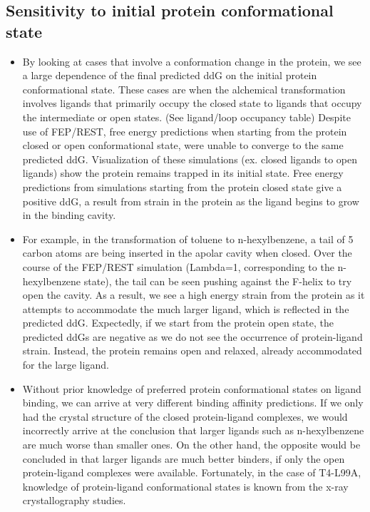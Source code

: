 \documentclass{article}
\begin{document}
\subsection{Sensitivity to initial protein conformational state}
   \begin{itemize}
   \item By looking at cases that involve a conformation change in the protein, we see a large dependence of the final predicted ddG on the initial protein conformational state.
      These cases are when the alchemical transformation involves ligands that primarily occupy the closed state to ligands that occupy the intermediate or open states. (See ligand/loop occupancy table)
      Despite use of FEP/REST, free energy predictions when starting from the protein closed or open conformational state, were unable to converge to the same predicted ddG.
      Visualization of these simulations (ex. closed ligands to open ligands) show the protein remains trapped in its initial state.
      Free energy predictions from simulations starting from the protein closed state give a positive ddG, a result from strain in the protein as the ligand begins to grow in the binding cavity.
   \item For example, in the transformation of toluene to n-hexylbenzene, a tail of 5 carbon atoms are being inserted in the apolar cavity when closed.
      Over the course of the FEP/REST simulation (Lambda=1, corresponding to the n-hexylbenzene state), the tail can be seen pushing against the F-helix to try open the cavity.
      As a result, we see a high energy strain from the protein as it attempts to accommodate the much larger ligand, which is reflected in the predicted ddG.
      Expectedly, if we start from the protein open state, the predicted ddGs are negative as we do not see the occurrence of protein-ligand strain.
      Instead, the protein remains open and relaxed, already accommodated for the large ligand.
   \item Without prior knowledge of preferred protein conformational states on ligand binding, we can arrive at very different binding affinity predictions.
      If we only had the crystal structure of the closed protein-ligand complexes, we would incorrectly arrive at the conclusion that larger ligands such as n-hexylbenzene are much worse than smaller ones.
      On the other hand, the opposite would be concluded in that larger ligands are much better binders, if only the open protein-ligand complexes were available.
      Fortunately, in the case of T4-L99A, knowledge of protein-ligand conformational states is known from the x-ray crystallography studies. \cite{Merski2015}

\end{itemize}
\end{document}
